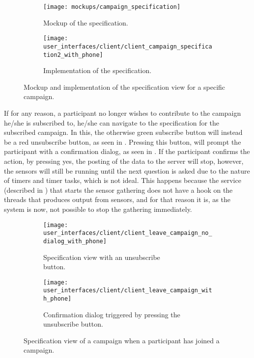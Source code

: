\begin{figure}[!htbp]
    \begin{subfigure}[!t]{.48\textwidth}
        \centering
        \texttt{[image: mockups/campaign\_specification]}
        \caption{Mockup of the specification.}
        \label{fig:mockup_campaign_specification}
    \end{subfigure}%
    \begin{subfigure}[!t]{.52\textwidth}
        \centering
        \texttt{[image: user\_interfaces/client/client\_campaign\_specification2\_with\_phone]}
        \caption{Implementation of the specification.}
        \label{fig:implementation_campaign_specification}
    \end{subfigure}
    \caption{Mockup and implementation of the specification view for a specific campaign.}
    \label{fig:campaign_specification}
\end{figure}
\FloatBarrier

If for any reason, a participant no longer wishes to contribute to the campaign he/she is subscribed to, he/she can navigate to the specification for the subscribed campaign. In this, the otherwise green subscribe button will instead be a red unsubscribe button, as seen in . Pressing this button, will prompt the participant with a confirmation dialog, as seen in . If the participant confirms the action, by pressing yes, the posting of the data to the server will stop, however, the sensors will still be running until the next question is asked due to the nature of timers and timer tasks, which is not ideal. This happens because the service (described in ) that starts the sensor gathering does not have a hook on the threads that produces output from sensors, and for that reason it is, as the system is now, not possible to stop the gathering immediately.

\begin{figure}[!htbp]
    \begin{subfigure}[!t]{.50\textwidth}
        \centering
        \texttt{[image: user\_interfaces/client/client\_leave\_campaign\_no\_dialog\_with\_phone]}
        \caption{Specification view with an unsubscribe \\\hspace{\textwidth}button.}
        \label{fig:leave_campaign_no_dialog}
    \end{subfigure}%
    \begin{subfigure}[!t]{.50\textwidth}
        \centering
        \texttt{[image: user\_interfaces/client/client\_leave\_campaign\_with\_phone]}
        \caption{Confirmation dialog triggered by pressing the unsubscribe button.}
        \label{fig:leave_campaign_dialog}
    \end{subfigure}
    \caption{Specification view of a campaign when a participant has joined a campaign.}
    \label{fig:leave_campaign}
\end{figure}
\FloatBarrier

